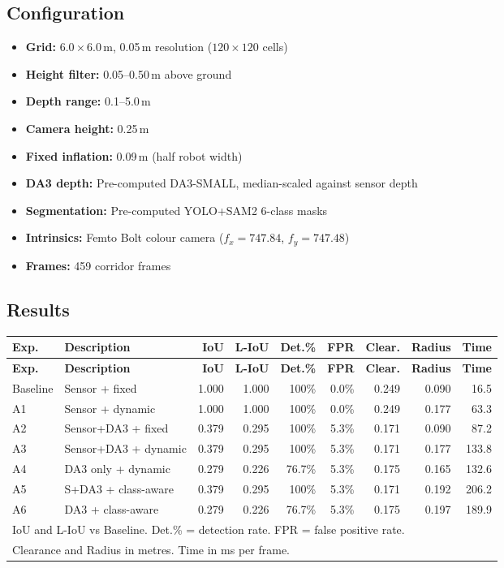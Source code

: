 \documentclass[11pt,a4paper]{article}
\begin{document}
\subsection{Configuration}

\begin{itemize}[nosep]
  \item \textbf{Grid:} $6.0 \times 6.0$\,m, 0.05\,m resolution ($120 \times 120$ cells)
  \item \textbf{Height filter:} 0.05--0.50\,m above ground
  \item \textbf{Depth range:} 0.1--5.0\,m
  \item \textbf{Camera height:} 0.25\,m
  \item \textbf{Fixed inflation:} 0.09\,m (half robot width)
  \item \textbf{DA3 depth:} Pre-computed DA3-SMALL, median-scaled against sensor depth
  \item \textbf{Segmentation:} Pre-computed YOLO+SAM2 6-class masks
  \item \textbf{Intrinsics:} Femto Bolt colour camera ($f_x = 747.84$, $f_y = 747.48$)
  \item \textbf{Frames:} 459 corridor frames
\end{itemize}

\subsection{Results}

\begin{longtable}{llrrrrrrr}
\toprule
\textbf{Exp.} & \textbf{Description} & \textbf{IoU} & \textbf{L-IoU} & \textbf{Det.\%} & \textbf{FPR} & \textbf{Clear.} & \textbf{Radius} & \textbf{Time} \\
\midrule
\endfirsthead
\toprule
\textbf{Exp.} & \textbf{Description} & \textbf{IoU} & \textbf{L-IoU} & \textbf{Det.\%} & \textbf{FPR} & \textbf{Clear.} & \textbf{Radius} & \textbf{Time} \\
\midrule
\endhead
Baseline & Sensor + fixed       & 1.000 & 1.000 & 100\% & 0.0\% & 0.249 & 0.090 & 16.5 \\
A1       & Sensor + dynamic     & 1.000 & 1.000 & 100\% & 0.0\% & 0.249 & 0.177 & 63.3 \\
A2       & Sensor+DA3 + fixed   & 0.379 & 0.295 & 100\% & 5.3\% & 0.171 & 0.090 & 87.2 \\
A3       & Sensor+DA3 + dynamic & 0.379 & 0.295 & 100\% & 5.3\% & 0.171 & 0.177 & 133.8 \\
A4       & DA3 only + dynamic   & 0.279 & 0.226 & 76.7\% & 5.3\% & 0.175 & 0.165 & 132.6 \\
A5       & S+DA3 + class-aware  & 0.379 & 0.295 & 100\% & 5.3\% & 0.171 & 0.192 & 206.2 \\
A6       & DA3 + class-aware    & 0.279 & 0.226 & 76.7\% & 5.3\% & 0.175 & 0.197 & 189.9 \\
\bottomrule
\multicolumn{9}{l}{\footnotesize IoU and L-IoU vs Baseline. Det.\% = detection rate. FPR = false positive rate.} \\
\multicolumn{9}{l}{\footnotesize Clearance and Radius in metres. Time in ms per frame.} \\
\end{longtable}
\end{document}

